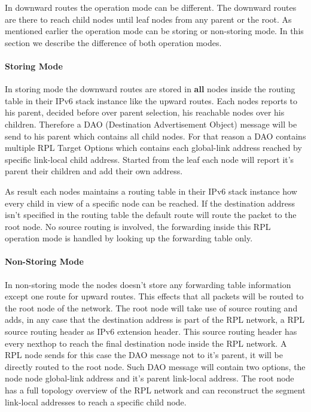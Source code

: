 \documentclass[letterpaper]{article}
\begin{document}
In downward routes the operation mode can be different.
The downward routes are there to reach child nodes until leaf nodes from any parent or the root.
As mentioned earlier the operation mode can be storing or non-storing mode.
In this section we describe the difference of both operation modes.

\paragraph{Storing Mode}

In storing mode the downward routes are stored in {\bf all} nodes inside the routing table in their IPv6 stack instance like the upward routes.
Each nodes reports to his parent, decided before over parent selection, his reachable nodes over his children.
Therefore a DAO (Destination Advertisement Object) message will be send to his parent which contains all child nodes.
For that reason a DAO contains multiple RPL Target Options which contains each global-link address reached by specific link-local child address.
Started from the leaf each node will report it's parent their children and add their own address.

As result each nodes maintains a routing table in their IPv6 stack instance how every child in view of a specific node can be reached.
If the destination address isn't specified in the routing table the default route will route the packet to the root node.
No source routing is involved, the forwarding inside this RPL operation mode is handled by looking up the forwarding table only.

\paragraph{Non-Storing Mode}

In non-storing mode the nodes doesn't store any forwarding table information except one route for upward routes.
This effects that all packets will be routed to the root node of the network.
The root node will take use of source routing and adds, in any case that the destination address is part of the RPL network, a RPL source routing header as IPv6 extension header.
This source routing header has every nexthop to reach the final destination node inside the RPL network.
A RPL node sends for this case the DAO message not to it's parent, it will be directly routed to the root node.
Such DAO message will contain two options, the node node global-link address and it's parent link-local address.
The root node has a full topology overview of the RPL network and can reconstruct the segment link-local addresses to reach a specific child node.
\end{document}
